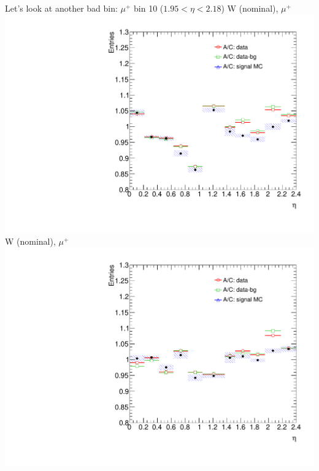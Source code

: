  {
Let's look at another bad bin: $\mu^{+}$ bin 10 ($1.95<\eta<2.18$)
}
 {
\colb[T]
\centering
\small{ W (nominal), $\mu^{+}$}
\includegraphics[width=1.0\textwidth]{dates/20130306/figures/wz/W_NOM_Q0_stack_d3_eta_lpt_met_y_2__1_z_0__1_POS}
\centering
\small{ W (nominal), $\mu^{+}$}
\includegraphics[width=1.0\textwidth]{dates/20130306/figures/wz/W_NOM_Q0_stack_d3_eta_lpt_met_y_2__1_z_0__1_NEG}
\cole
}
